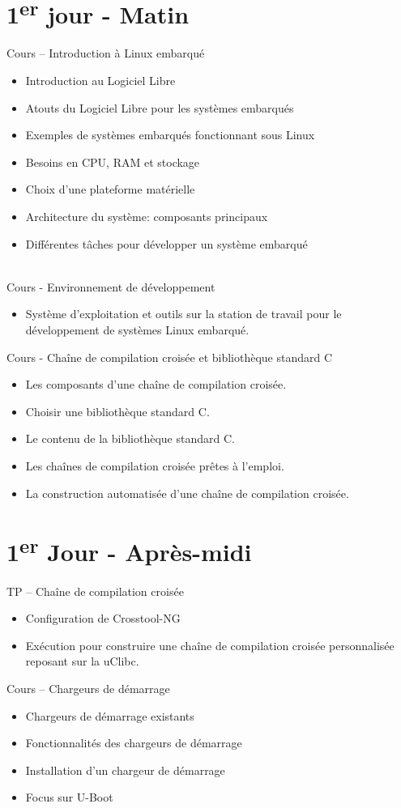 \documentclass[a4paper,12pt,obeyspaces,spaces,hyphens]{article}
\begin{document}
\section{1\textsuperscript{er} jour - Matin}

\feagendaonecolumn
{Cours – Introduction à Linux embarqué}
{
  \begin{itemize}
  \item Introduction au Logiciel Libre
  \item Atouts du Logiciel Libre pour les systèmes embarqués
  \item Exemples de systèmes embarqués fonctionnant sous Linux
  \item Besoins en CPU, RAM et stockage
  \item Choix d'une plateforme matérielle
  \item Architecture du système: composants principaux
  \item Différentes tâches pour développer un système embarqué
  \end{itemize}
}
\\
\feagendatwocolumn
{Cours - Environnement de développement}
{
  \begin{itemize}
  \item Système d'exploitation et outils sur la station de travail
	pour le développement de systèmes Linux embarqué.
  \end{itemize}
}
{Cours - Chaîne de compilation croisée et bibliothèque standard C}
{
  \begin{itemize}
  \item Les composants d'une chaîne de compilation croisée.
  \item Choisir une bibliothèque standard C.
  \item Le contenu de la bibliothèque standard C.
  \item Les chaînes de compilation croisée prêtes à l'emploi.
  \item La construction automatisée d'une chaîne de compilation croisée.
  \end{itemize}
}

\section{1\textsuperscript{er} Jour - Après-midi}
\feagendatwocolumn
{TP – Chaîne de compilation croisée}
{
  \begin{itemize}
  \item Configuration de Crosstool-NG
  \item Exécution pour construire une chaîne de compilation croisée
	personnalisée reposant sur la uClibc.
  \end{itemize}
}
{Cours – Chargeurs de démarrage}
{
  \begin{itemize}
  \item Chargeurs de démarrage existants
  \item Fonctionnalités des chargeurs de démarrage
  \item Installation d'un chargeur de démarrage
  \item Focus sur U-Boot
  \end{itemize}
}
\\
\end{document}

